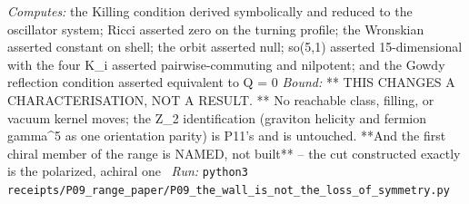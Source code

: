 \begin{description}
\emph{Computes:} the Killing condition derived symbolically and reduced to the oscillator system; Ricci asserted zero on the turning profile; the Wronskian asserted constant on shell; the orbit asserted null; so(5,1) asserted 15-dimensional with the four K\_i asserted pairwise-commuting and nilpotent; and the Gowdy reflection condition asserted equivalent to Q = 0
 \emph{Bound:} ** THIS CHANGES A CHARACTERISATION, NOT A RESULT. ** No reachable class, filling, or vacuum kernel moves; the Z\_2 identification (graviton helicity and fermion gamma\textasciicircum{}5 as one orientation parity) is P11's and is untouched. **And the first chiral member of the range is NAMED, not built** -- the cut constructed exactly is the polarized, achiral one
\ \emph{Run:} \texttt{python3 receipts/P09\_range\_paper/P09\_the\_wall\_is\_not\_the\_loss\_of\_symmetry.py}
\end{description}\endgroup
